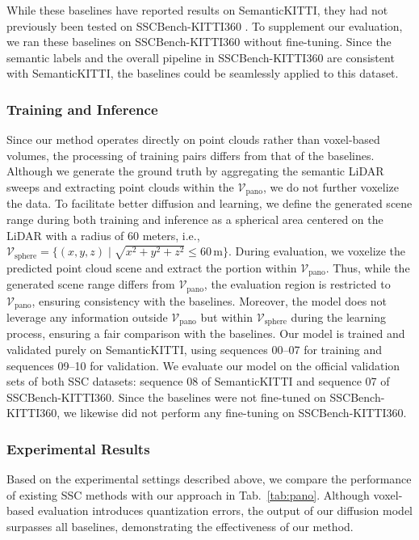 \documentclass[conference]{IEEEtran}
\begin{document}
While these baselines have reported results on SemanticKITTI, they had not previously been tested on SSCBench-KITTI360 \cite{yli2020}.
To supplement our evaluation, we ran these baselines on SSCBench-KITTI360 without fine-tuning.
Since the semantic labels and the overall pipeline in SSCBench-KITTI360 are consistent with SemanticKITTI, the baselines could be seamlessly applied to this dataset.

\subsubsection{Training and Inference}

Since our method operates directly on point clouds rather than voxel-based volumes, the processing of training pairs differs from that of the baselines.
Although we generate the ground truth by aggregating the semantic LiDAR sweeps and extracting point clouds within the $\mathcal{V}_\mathrm{pano}$, we do not further voxelize the data.
To facilitate better diffusion and learning, we define the generated scene range during both training and inference as a spherical area centered on the LiDAR with a radius of 60 meters, i.e.,
$\mathcal{V}_\mathrm{sphere} = \{(x,y,z) \mid \sqrt{x^2+y^2+z^2} \leq 60\,\text{m}\}$.
During evaluation, we voxelize the predicted point cloud scene and extract the portion within $\mathcal{V}_\mathrm{pano}$.
Thus, while the generated scene range differs from $\mathcal{V}_\mathrm{pano}$, the evaluation region is restricted to $\mathcal{V}_\mathrm{pano}$, ensuring consistency with the baselines.
Moreover, the model does not leverage any information outside $\mathcal{V}_\mathrm{pano}$ but within $\mathcal{V}_\mathrm{sphere}$ during the learning process, ensuring a fair comparison with the baselines.
Our model is trained and validated purely on SemanticKITTI, using sequences 00--07 for training and sequences 09--10 for validation.
We evaluate our model on the official validation sets of both SSC datasets: sequence 08 of SemanticKITTI and sequence 07 of SSCBench-KITTI360.
Since the baselines were not fine-tuned on SSCBench-KITTI360, we likewise did not perform any fine-tuning on SSCBench-KITTI360.

\subsubsection{Experimental Results}

Based on the experimental settings described above, we compare the performance of existing SSC methods with our approach in Tab.~\ref{tab:pano}.
Although voxel-based evaluation introduces quantization errors, the output of our diffusion model surpasses all baselines, demonstrating the effectiveness of our method.
\end{document}
